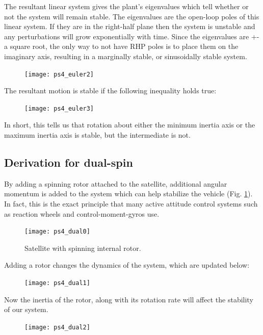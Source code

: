 \documentclass[12pt, letterpaper]{article}
\begin{document}
The resultant linear system gives the plant's eigenvalues which tell whether or not the system will remain stable. The eigenvalues are the open-loop poles of this linear system. If they are in the right-half plane then the system is unstable and any perturbations will grow exponentially with time. Since the eigenvalues are +- a square root, the only way to not have RHP poles is to place them on the imaginary axis, resulting in a marginally stable, or sinusoidally stable system.

\begin{figure}[H]
	\centering
	\texttt{[image: ps4\_euler2]}
\end{figure}

The resultant motion is stable if the following inequality holds true:

\begin{figure}[H]
	\centering
	\texttt{[image: ps4\_euler3]}
\end{figure}

In short, this tells us that rotation about either the minimum inertia axis or the maximum inertia axis is stable, but the intermediate is not.


\subsection{Derivation for dual-spin}

By adding a spinning rotor attached to the satellite, additional angular momentum is added to the system which can help stabilize the vehicle (Fig. \ref{4:dual}). In fact, this is the exact principle that many active attitude control systems such as reaction wheels and control-moment-gyros use.

\begin{figure}[H]
	\centering
	\texttt{[image: ps4\_dual0]}
	\caption{Satellite with spinning internal rotor.}
	\label{4:dual}
\end{figure}

Adding a rotor changes the dynamics of the system, which are updated below:

\begin{figure}[H]
	\centering
	\texttt{[image: ps4\_dual1]}
\end{figure}

Now the inertia of the rotor, along with its rotation rate will affect the stability of our system.

\begin{figure}[H]
	\centering
	\texttt{[image: ps4\_dual2]}
\end{figure}
\end{document}
